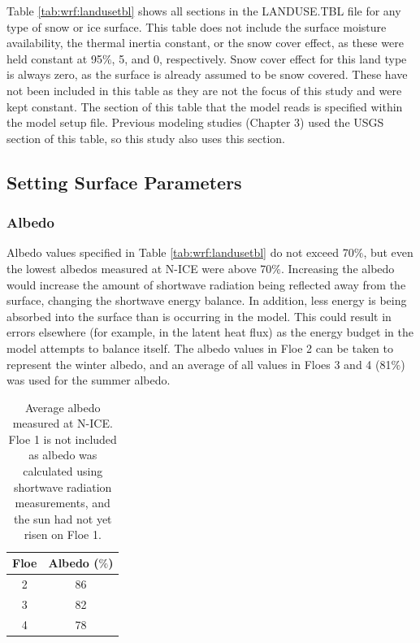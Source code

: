 Table \ref{tab:wrf:landusetbl} shows all sections in the LANDUSE.TBL file for any type of snow or ice surface. This table does not include the surface moisture availability, the thermal inertia constant, or the snow cover effect, as these were held constant at 95$\%$, 5, and 0, respectively. Snow cover effect for this land type is always zero, as the surface is already assumed to be snow covered. These have not been included in this table as they are not the focus of this study and were kept constant. The section of this table that the model reads is specified within the model setup file. Previous modeling studies (Chapter 3) used the USGS section of this table, so this study also uses this section.

\subsection{Setting Surface Parameters}
\subsubsection{Albedo}
Albedo values specified in Table \ref{tab:wrf:landusetbl} do not exceed 70$\%$, but even the lowest albedos measured at N-ICE were above 70$\%$. Increasing the albedo would increase the amount of shortwave radiation being reflected away from the surface, changing the shortwave energy balance. In addition, less energy is being absorbed into the surface than is occurring in the model. This could result in errors elsewhere (for example, in the latent heat flux) as the energy budget in the model attempts to balance itself. The albedo values in Floe 2 can be taken to represent the winter albedo, and an average of all values in Floes 3 and 4 (81$\%$) was used for the summer albedo.

\begin{table}[t]
\centering
\footnotesize
\doublespacing 
{
\begin{tabular}{| c | c |}
 \hline
\rowcolor[HTML]{F3F3F3} \textbf{Floe} & \textbf{Albedo ($\%$)} \\
\hline
2 & 86 \\
3 & 82 \\
4 & 78 \\
 \hline
\end{tabular}}
\caption[N-ICE average measured albedo.]{Average albedo measured at N-ICE. Floe 1 is not included as albedo was calculated using shortwave radiation measurements, and the sun had not yet risen on Floe 1.}
\label{tab:albedos}
\end{table}

